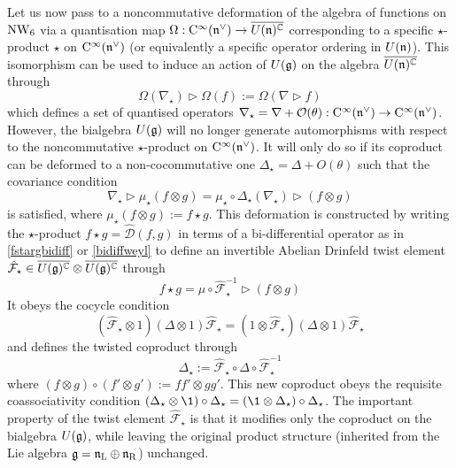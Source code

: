 Let us now pass to a noncommutative deformation of the algebra of functions on
$\operatorname{NW}_6$ via a quantisation map $\Omega:{\rm C}^\infty({\mathfrak n}^\vee) \to
\overline{U({\mathfrak n})^{\mathbb C}}$ corresponding to a specific $\star$-product $\star$
on ${\rm C}^\infty({\mathfrak n}^\vee)$ (or equivalently a specific operator ordering in
$U({\mathfrak n})$). This isomorphism can be used to induce an action of $U({\mathfrak g})$ on the
algebra $\overline{U({\mathfrak n})^{\mathbb C}}$ through
\begin{equation}
  \label{nablastar}
  \Omega(\nabla_\star)\triangleright\Omega(f):=
  \Omega(\nabla\triangleright f)
\end{equation}
which defines a set of quantised operators $\nabla_\star = \nabla+{\mathcal
  O}(\theta): {\rm C}^\infty({\mathfrak n}^\vee)\to{\rm C}^\infty({\mathfrak n}^\vee)$. However, the
bialgebra $U({\mathfrak g})$ will no longer generate automorphisms with respect to the
noncommutative $\star$-product on ${\rm C}^\infty({\mathfrak n}^\vee)$. It will only do so if
its coproduct can be deformed to a non-cocommutative one
$\Delta_\star=\Delta+O(\theta)$ such that the covariance condition
\begin{equation}
  \label{NCcoprodcomp}
  \nabla_\star\triangleright\mu_\star(f\otimes g)=\mu_\star\circ
  \Delta_\star(\nabla_\star)\triangleright(f\otimes g)
\end{equation}
is satisfied, where $\mu_\star(f\otimes g):=f\star g$. This deformation is
constructed by writing the $\star$-product $f\star g=\hat{\mathcal D}(f,g)$ in
terms of a bi-differential operator as in \eqref{fstargbidiff} or
\eqref{bidiffweyl} to define an invertible Abelian Drinfeld twist \cite{Resh1}
element $\hat{\mathcal F}_\star\in
\overline{U({\mathfrak g})^{\mathbb C}}\otimes\overline{U({\mathfrak g})^{\mathbb C}}$ through
\begin{equation}
  \label{Dtwistdef}
  f\star g=\mu\circ\hat{\mathcal F}_\star^{-1}\triangleright(f\otimes g)
\end{equation}
It obeys the cocycle condition
\begin{equation}
  \label{twistcocycle}
  (\hat{\mathcal F}_\star\otimes1) (\Delta\otimes1) \hat
  {\mathcal F}_\star=(1\otimes\hat{\mathcal F}_\star) 
  (\Delta\otimes1) \hat{\mathcal F}_\star
\end{equation}
and defines the twisted coproduct through
\begin{equation}
  \label{Deltastardef}
  \Delta_\star:=\hat{\mathcal F}_\star\circ\Delta\circ
  \hat{\mathcal F}_\star^{-1}
\end{equation}
where $(f\otimes g)\circ(f'\otimes g' ):=f f'\otimes g g'$. This new coproduct
obeys the requisite coassociativity condition $(\Delta_\star\otimes\1)
\circ\Delta_\star=(\1\otimes\Delta_\star) \circ\Delta_\star$. The important
property of the twist element $\hat{\mathcal F}_\star$ is that it modifies only
the coproduct on the bialgebra $U({\mathfrak g})$, while leaving the original product
structure (inherited from the Lie algebra ${\mathfrak g}={\mathfrak n}_{\rm L}\oplus{\mathfrak n}_{\rm R}$)
unchanged.

